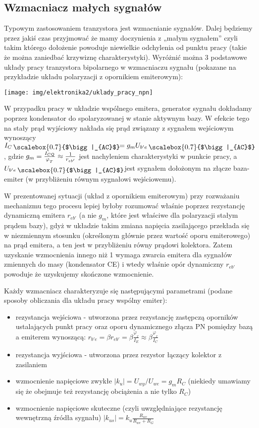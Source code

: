 \documentclass{pdfBooklets}
\newcommand\inpoint[1]{%
	\hspace{.4ex}\raisebox{-.55ex}{\scalebox{0.7}{$\bigg|_{#1}$}}\hspace{-.8ex}
}
\begin{document}
\subsection{Wzmacniacz małych sygnałów}

Typowym zastosowaniem tranzystora jest wzmacnianie sygnałów.
Dalej będziemy przez jakiś czas przyjmować że mamy doczynienia z „małym sygnałem” czyli takim którego dołożenie powoduje niewielkie odchylenia od punktu pracy (takie że można zaniedbać krzywiznę charakterystyki).
Wyróżnić można 3 podstawowe układy pracy tranzystora bipolarnego w wzmacniaczu sygnału (pokazane na przykładzie układu polaryzacji z opornikiem emiterowym):

\begin{center}\texttt{[image: img/elektronika2/uklady\_pracy\_npn]}\end{center}

W przypadku pracy w układzie wspólnego emitera, generator sygnału dokładamy poprzez kondensator do spolaryzowanej w stanie aktywnym bazy.
W efekcie tego na stały prąd wyjściowy nakłada się prąd związany z sygnałem wejściowym wynoszący $I_C \inpoint{AC} = g_m U_{b'e} \inpoint{AC}$, gdzie $g_m = {I_{CQ} \over \varphi_{_T}} \approx {1 \over r_{eb'}}$ jest nachyleniem charakterystyki w punkcie pracy, a $U_{b'e} \inpoint{AC}$ jest sygnałem dołożonym na złącze baza-emiter (w przybliżeniu równym sygnałowi wejściowemu).

W prezentowanej sytuacji (układ z opornikiem emiterowym) przy rozważaniu mechanizmu tego procesu lepiej byłoby rozumować właśnie poprzez rezystancję dynamiczną emitera $r_{eb'}$ (a nie $g_m$, które jest właściwe dla polaryzacji stałym prądem bazy), gdyż w układzie takim zmiana napięcia zasilającego przekłada się w niezmiennym stosunku (określonym głównie przez wartość oporu emiterowego) na prąd emitera, a ten jest w przybliżeniu równy prądowi kolektora.
Zatem uzyskanie wzmocnienia innego niż 1 wymaga zwarcia emitera dla sygnałów zmiennych do masy (kondensator CE) i wtedy właśnie opór dynamiczny $r_{eb'}$ powoduje że uzyskujemy skończone wzmocnienie.

Każdy wzmacniacz charakteryzuje się następującymi parametrami (podane sposoby obliczania dla układu pracy wspólny emiter):\begin{itemize}
	\item rezystancja wejściowa - utworzona przez rezystancję zastępczą oporników ustalających punkt pracy oraz oporu dynamicznego złącza PN pomiędzy bazą a emiterem wynoszącą: $r_{b'e}=\beta r_{eb'} = \beta \frac{\varphi_{_T}}{I_E} \approx \beta \frac{\varphi_{_T}}{I_C}$
	\item rezystancja wyjściowa - utworzona przez rezystor łączący kolektor z zasilaniem
	\item wzmocnienie napięciowe zwykłe $|k_u| = U_{wy} / U_{we} = g_m R_C$ (niekiedy umawiamy się że obejmuje też rezystancję obciążenia a nie tylko $R_C$)
	\item wzmocnienie napięciowe skuteczne (czyli uwzględniające rezystancję wewnętrzną źródła sygnału) $|k_{us}| = k_u \frac{R_{we}}{R_{we} + R_G}$
\end{itemize}
\end{document}
